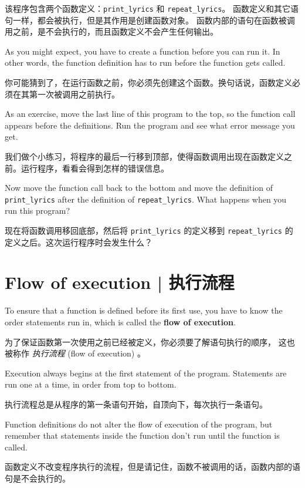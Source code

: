 该程序包含两个函数定义：\lstinline{print_lyrics} 和 \lstinline{repeat_lyrics}。
函数定义和其它语句一样，都会被执行，但是其作用是创建函数对象。
函数内部的语句在函数被调用之前，是不会执行的，而且函数定义不会产生任何输出。

As you might expect, you have to create a function before you can
run it.  In other words, the function definition has to run
before the function gets called.

你可能猜到了，在运行函数之前，你必须先创建这个函数。换句话说，函数定义必须在其第一次被调用之前执行。

As an exercise, move the last line of this program
to the top, so the function call appears before the definitions. Run
the program and see what error
message you get.

我们做个小练习，将程序的最后一行移到顶部，使得函数调用出现在函数定义之前。运行程序，看看会得到怎样的错误信息。


Now move the function call back to the bottom
and move the definition of \verb"print_lyrics" after the definition of
\verb"repeat_lyrics".  What happens when you run this program?

现在将函数调用移回底部，然后将 \lstinline{print_lyrics} 的定义移到 \lstinline{repeat_lyrics} 的定义之后。这次运行程序时会发生什么？


%
\section{Flow of execution  |  执行流程}

To ensure that a function is defined before its first use,
you have to know the order statements run in, which is
called the {\bf flow of execution}.

为了保证函数第一次使用之前已经被定义，你必须要了解语句执行的顺序，
这也被称作 \emph{执行流程} (flow of execution) 。

Execution always begins at the first statement of the program.
Statements are run one at a time, in order from top to bottom.

执行流程总是从程序的第一条语句开始，自顶向下，每次执行一条语句。

Function definitions do not alter the flow of execution of the
program, but remember that statements inside the function don't
run until the function is called.

函数定义不改变程序执行的流程，但是请记住，函数不被调用的话，函数内部的语句是不会执行的。

